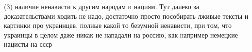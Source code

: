  
 
 
 
 

(3) наличие ненависти к другим народам и нациям. Тут далеко за доказательствами
ходить не надо, достаточно просто пособирать лживые тексты и картинки про
украинцев, полные какой то безумной ненависти, при том, что украинцы в целом
даже никак не нападали на россию, как например немецкие нацисты на ссср

